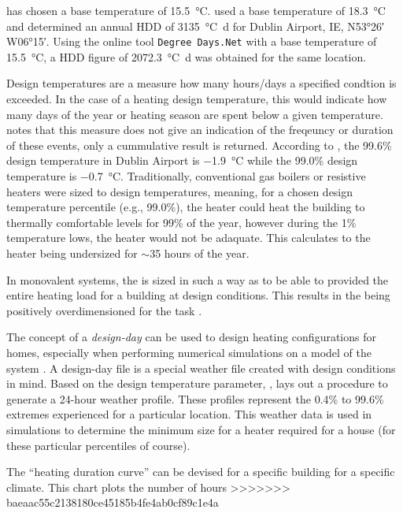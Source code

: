  has chosen a base temperature of \SI{15.5}{\celsius}.  used a base temperature of \SI{18.3}{\celsius} and determined an annual \ac{HDD} of \SI{3135}{\celsius\day} for Dublin Airport, IE, N\ang{53;26;} W\ang{06;15;}. Using the online tool \texttt{Degree Days.Net} \cite{degreedays} with a base temperature of \SI{15.5}{\celsius}, a \ac{HDD} figure of \SI{2072.3}{\celsius\day} was obtained for the same location.  

Design temperatures are a measure how many hours/days a specified condtion is exceeded. In the case of a heating design temperature, this would indicate how many days of the year or heating season are spent below a given temperature.  notes that this measure does not give an indication of the freqeuncy or duration of these events, only a cummulative result is returned. According to , the 99.6\% design temperature in Dublin Airport is \SI{-1.9}{\celsius} while the 99.0\% design temperature is \SI{-0.7}{\celsius}. Traditionally, conventional gas boilers or resistive heaters were sized to design temperatures, meaning, for a chosen design temperature percentile (e.g., 99.0\%), the heater could heat the building to thermally comfortable levels for 99\% of the year, however during the 1\% temperature lows, the heater would not be adaquate. This calculates to the heater being undersized for $\sim$35 hours of the year. 

In monovalent systems, the \HP is sized in such a way as to be able to provided the entire heating load for a building at design conditions. This results in the \HP being positively overdimensioned for the task \cite{klein_numerical_2014}. 

The concept of a \textit{design-day} can be used to design heating configurations for homes, especially when performing numerical simulations on a model of the system \cite{rauschkolb_cost-optimal_2020}. A design-day file is a special weather file created with design conditions in mind. Based on the design temperature parameter, , lays out a procedure to generate a 24-hour weather profile. These profiles represent the 0.4\% to 99.6\% extremes experienced for a particular location. This weather data is used in simulations to determine the minimum size for a heater required for a house (for these particular percentiles of course). 

The ``heating duration curve'' can be devised for a specific building for a specific climate. This chart plots the number of hours 
>>>>>>> baeaac55c2138180ce45185b4fe4ab0cf89c1e4a
